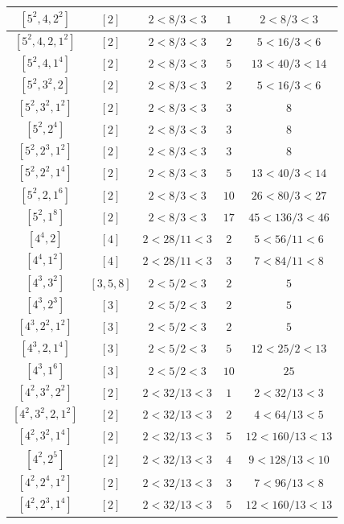 \documentclass{article}%
\begin{document}
\begin{center}
\begin{longtable}{||c|c|c|c|c||}
$[5^{2}, 4, 2^{2}]$ & $[2]$ & $2 < 8/3 < 3$ & $1$ & $2 < 8/3 < 3$ \\ \hline 
$[5^{2}, 4, 2, 1^{2}]$ & $[2]$ & $2 < 8/3 < 3$ & $2$ & $5 < 16/3 < 6$ \\ \hline 
$[5^{2}, 4, 1^{4}]$ & $[2]$ & $2 < 8/3 < 3$ & $5$ & $13 < 40/3 < 14$ \\ \hline 
$[5^{2}, 3^{2}, 2]$ & $[2]$ & $2 < 8/3 < 3$ & $2$ & $5 < 16/3 < 6$ \\ \hline 
$[5^{2}, 3^{2}, 1^{2}]$ & $[2]$ & $2 < 8/3 < 3$ & $3$ & $8$ \\ \hline 
$[5^{2}, 2^{4}]$ & $[2]$ & $2 < 8/3 < 3$ & $3$ & $8$ \\ \hline 
$[5^{2}, 2^{3}, 1^{2}]$ & $[2]$ & $2 < 8/3 < 3$ & $3$ & $8$ \\ \hline 
$[5^{2}, 2^{2}, 1^{4}]$ & $[2]$ & $2 < 8/3 < 3$ & $5$ & $13 < 40/3 < 14$ \\ \hline 
$[5^{2}, 2, 1^{6}]$ & $[2]$ & $2 < 8/3 < 3$ & $10$ & $26 < 80/3 < 27$ \\ \hline 
$[5^{2}, 1^{8}]$ & $[2]$ & $2 < 8/3 < 3$ & $17$ & $45 < 136/3 < 46$ \\ \hline 
$[4^{4}, 2]$ & $[4]$ & $2 < 28/11 < 3$ & $2$ & $5 < 56/11 < 6$ \\ \hline 
$[4^{4}, 1^{2}]$ & $[4]$ & $2 < 28/11 < 3$ & $3$ & $7 < 84/11 < 8$ \\ \hline 
$[4^{3}, 3^{2}]$ & $[3, 5, 8]$ & $2 < 5/2 < 3$ & $2$ & $5$ \\ \hline 
$[4^{3}, 2^{3}]$ & $[3]$ & $2 < 5/2 < 3$ & $2$ & $5$ \\ \hline 
$[4^{3}, 2^{2}, 1^{2}]$ & $[3]$ & $2 < 5/2 < 3$ & $2$ & $5$ \\ \hline 
$[4^{3}, 2, 1^{4}]$ & $[3]$ & $2 < 5/2 < 3$ & $5$ & $12 < 25/2 < 13$ \\ \hline 
$[4^{3}, 1^{6}]$ & $[3]$ & $2 < 5/2 < 3$ & $10$ & $25$ \\ \hline 
$[4^{2}, 3^{2}, 2^{2}]$ & $[2]$ & $2 < 32/13 < 3$ & $1$ & $2 < 32/13 < 3$ \\ \hline 
$[4^{2}, 3^{2}, 2, 1^{2}]$ & $[2]$ & $2 < 32/13 < 3$ & $2$ & $4 < 64/13 < 5$ \\ \hline 
$[4^{2}, 3^{2}, 1^{4}]$ & $[2]$ & $2 < 32/13 < 3$ & $5$ & $12 < 160/13 < 13$ \\ \hline 
$[4^{2}, 2^{5}]$ & $[2]$ & $2 < 32/13 < 3$ & $4$ & $9 < 128/13 < 10$ \\ \hline 
$[4^{2}, 2^{4}, 1^{2}]$ & $[2]$ & $2 < 32/13 < 3$ & $3$ & $7 < 96/13 < 8$ \\ \hline 
$[4^{2}, 2^{3}, 1^{4}]$ & $[2]$ & $2 < 32/13 < 3$ & $5$ & $12 < 160/13 < 13$ \\ \hline 

\end{longtable}
\end{center}
\end{document}
